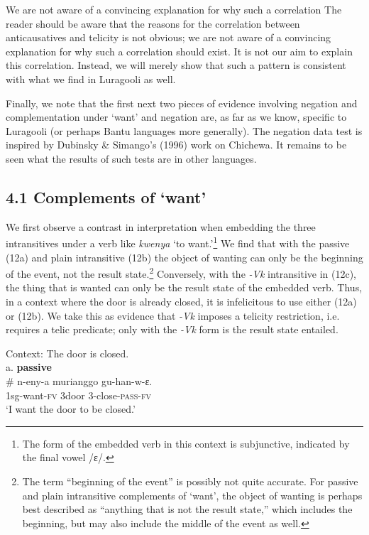 \documentclass[output=paper]{langsci/langscibook}
\begin{document}
We are not aware of a convincing explanation for why such a correlation The reader should be aware that the reasons for the correlation between anticausatives 
 and telicity is not obvious; we are not aware of a convincing explanation for why such a correlation should exist. It is not our aim to explain this correlation. Instead, we will merely show that such a pattern is consistent with what we find in Luragooli as well. 

  Finally, we note that the first next two pieces of evidence involving negation and complementation under ‘want’ and negation are, as far as we know, specific to Luragooli (or perhaps Bantu languages more generally). The negation data test is inspired by Dubinsky \& Simango’s (1996) work on Chichewa. It remains to be seen what the results of such tests are in other languages. 

\subsection{4.1 Complements of ‘want’}

We first observe a contrast in interpretation when embedding the three intransitives under a verb like \textit{kwenya} ‘to want.’\footnote{ The form of the embedded verb in this context is subjunctive, indicated by the final vowel /ɛ/.} We find that with the passive (12a) and plain intransitive (12b) the object of wanting can only be the beginning of the event, not the result state.\footnote{ The term “beginning of the event” is possibly not quite accurate. For passive and plain intransitive complements of ‘want’, the object of wanting is perhaps best described as “anything that is not the result state,” which includes the beginning, but may also include the middle of the event as well. } Conversely, with the \textit{{}-Vk} intransitive in (12c), the thing that is wanted can only be the result state of the embedded verb. Thus, in a context where the door is already closed, it is infelicitous to use either (12a) or (12b). We take this as evidence that \textit{{}-Vk} imposes a telicity restriction, i.e. requires a telic predicate; only with the \textit{{}-Vk} form is the result state entailed.

\ea
{Context: The door is closed.}\\
[a. passive]{a. \textbf{passive}}\\
\gll   \# n-eny-a       murianggo gu-han-w-ɛ.\\
     \textit{  }1sg-want-\textsc{fv} 3door         3-close-\textsc{pass}{}-\textsc{fv}\\
\glt ‘I want the door to be closed.’
\z
\end{document}
